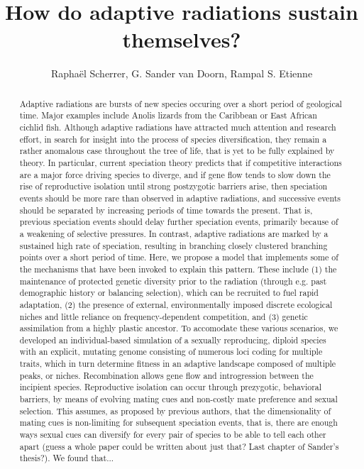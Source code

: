 \documentclass[]{article}
\title{How do adaptive radiations sustain themselves?}
\author{Rapha\"{e}l Scherrer, G. Sander van Doorn, Rampal S. Etienne}
\begin{document}
\maketitle

\begin{abstract}

Adaptive radiations are bursts of new species occuring over a short period of geological time. Major examples include Anolis lizards from the Caribbean or East African cichlid fish. Although adaptive radiations have attracted much attention and research effort, in search for insight into the process of species diversification, they remain a rather anomalous case throughout the tree of life, that is yet to be fully explained by theory. In particular, current speciation theory predicts that if competitive interactions are a major force driving species to diverge, and if gene flow tends to slow down the rise of reproductive isolation until strong postzygotic barriers arise, then speciation events should be more rare than observed in adaptive radiations, and successive events should be separated by increasing periods of time towards the present. That is, previous speciation events should delay further speciation events, primarily because of a weakening of selective pressures. In contrast, adaptive radiations are marked by a sustained high rate of speciation, resulting in branching closely clustered branching points over a short period of time. Here, we propose a model that implements some of the mechanisms that have been invoked to explain this pattern. These include (1) the maintenance of protected genetic diversity prior to the radiation (through e.g. past demographic history or balancing selection), which can be recruited to fuel rapid adaptation, (2) the presence of external, environmentally imposed discrete ecological niches and little reliance on frequency-dependent competition, and (3) genetic assimilation from a highly plastic ancestor. To accomodate these various scenarios, we developed an individual-based simulation of a sexually reproducing, diploid species with an explicit, mutating genome consisting of numerous loci coding for multiple traits, which in turn determine fitness in an adaptive landscape composed of multiple peaks, or niches. Recombination allows gene flow and introgression between the incipient species. Reproductive isolation can occur through prezygotic, behavioral barriers, by means of evolving mating cues and non-costly mate preference and sexual selection. This assumes, as proposed by previous authors, that the dimensionality of mating cues is non-limiting for subsequent speciation events, that is, there are enough ways sexual cues can diversify for every pair of species to be able to tell each other apart (guess a whole paper could be written about just that? Last chapter of Sander's thesis?). We found that...

\end{abstract}
\end{document}
